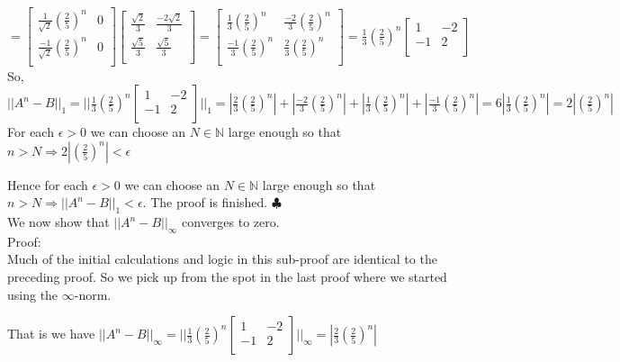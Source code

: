 \documentclass[12pt]{article}
\newenvironment{problems}{\begin{list}{}{\setlength{\labelwidth}{.7in}}}{\end{list}}
\begin{document}
\begin{problems}
  $ = \begin{bmatrix}
   \frac{1}{\sqrt{2}}(\frac{2}{5})^n  &  0 \\
   \frac{-1}{\sqrt{2}}(\frac{2}{5})^n &  0 \\
  \end{bmatrix} 
\begin{bmatrix}
   \frac{\sqrt{2}}{3}  &  \frac{-2\sqrt{2}}{3} \\
   \frac{\sqrt{5}}{3}  &  \frac{\sqrt{5}}{3} \\
  \end{bmatrix}=
   \begin{bmatrix}
   \frac{1}{3}(\frac{2}{5})^n  &  \frac{-2}{3}(\frac{2}{5})^n \\
   \frac{-1}{3}(\frac{2}{5})^n  &  \frac{2}{3}(\frac{2}{5})^n\\
  \end{bmatrix}=
  \frac{1}{3}(\frac{2}{5})^n
  \begin{bmatrix}
   1 &  -2 \\
   -1 &  2\\
  \end{bmatrix}$\\
  
  So, $||A^n-B||_1 = || 
  \frac{1}{3}(\frac{2}{5})^n
  \begin{bmatrix}
   1 &  -2 \\
   -1 &  2\\
  \end{bmatrix}    ||_1 = |\frac{2}{3}(\frac{2}{5})^n| + |\frac{-2}{3}(\frac{2}{5})^n| + |\frac{1}{3}(\frac{2}{5})^n| + |\frac{-1}{3}(\frac{2}{5})^n| = 6|\frac{1}{3}(\frac{2}{5})^n| = 2|(\frac{2}{5})^n| $\\
  
 For each $\epsilon >0$ we can choose an $N\in \mathbb{N}$ large enough so that $n > N \Rightarrow 2|(\frac{2}{5})^n| <\epsilon$ 
 
 Hence for each  $\epsilon >0$ we can choose an $N\in \mathbb{N}$ large enough so that $n > N \Rightarrow ||A^n-B||_1 <\epsilon$. The proof is finished.  \hfill $\clubsuit$\\

We now show that $||A^n-B||_{\infty}$ converges to zero.\\
Proof:\\
Much of the initial calculations and logic in this sub-proof are identical to the preceding proof. So we pick up from the spot in the last proof where we started using the $\infty$-norm.

That is we have $||A^n-B||_{\infty} = || 
  \frac{1}{3}(\frac{2}{5})^n
  \begin{bmatrix}
   1 &  -2 \\
   -1 &  2\\
  \end{bmatrix}    ||_{\infty} = |\frac{2}{3}(\frac{2}{5})^n|$\\
  

\end{problems}
\end{document}
